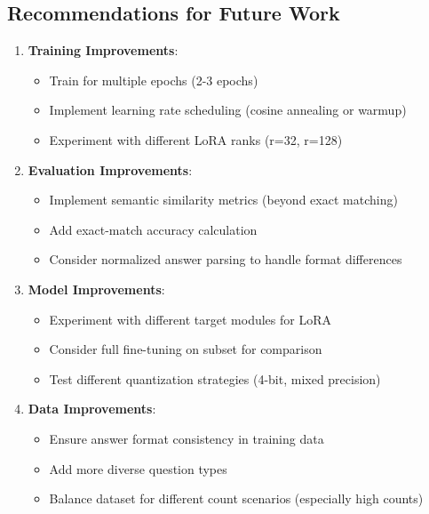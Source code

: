 \documentclass[conference]{IEEEtran}
\begin{document}
\subsection{Recommendations for Future Work}

\begin{enumerate}
    \item \textbf{Training Improvements}:
    \begin{itemize}
        \item Train for multiple epochs (2-3 epochs)
        \item Implement learning rate scheduling (cosine annealing or warmup)
        \item Experiment with different LoRA ranks (r=32, r=128)
    \end{itemize}
    
    \item \textbf{Evaluation Improvements}:
    \begin{itemize}
        \item Implement semantic similarity metrics (beyond exact matching)
        \item Add exact-match accuracy calculation
        \item Consider normalized answer parsing to handle format differences
    \end{itemize}
    
    \item \textbf{Model Improvements}:
    \begin{itemize}
        \item Experiment with different target modules for LoRA
        \item Consider full fine-tuning on subset for comparison
        \item Test different quantization strategies (4-bit, mixed precision)
    \end{itemize}
    
    \item \textbf{Data Improvements}:
    \begin{itemize}
        \item Ensure answer format consistency in training data
        \item Add more diverse question types
        \item Balance dataset for different count scenarios (especially high counts)
    \end{itemize}
\end{enumerate}
\end{document}
